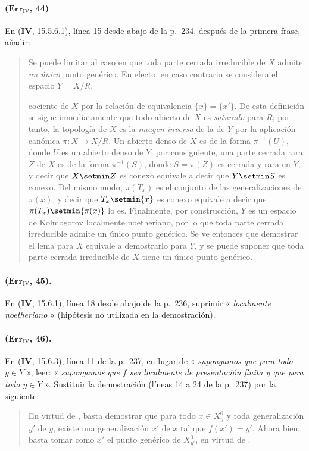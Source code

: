 \paragraph{($\mathbf{Err}_{\mathrm{IV}}$, 44)}
En (\textbf{IV}, 15.5.6.1), línea 15 desde abajo de la p.~234, después de la primera
frase, añadir:

\begin{quote}
Se puede limitar al caso en que toda parte cerrada irreducible de $X$
admite \emph{un único} punto genérico. En efecto, en caso contrario se considera
el espacio $Y=X/R$,

cociente de $X$ por la relación de equivalencia
$\overline{\{x\}}=\overline{\{x'\}}$. De esta definición se sigue
inmediatamente que todo abierto de $X$ es \emph{saturado} para $R$; por tanto, la
topología de $X$ es la \emph{imagen inversa} de la de $Y$ por la aplicación
canónica $\pi:X\to X/R$. Un abierto denso de $X$ es de la forma
$\pi^{-1}(U)$, donde $U$ es un abierto denso de $Y$; por consiguiente, una
parte cerrada rara $Z$ de $X$ es de la forma $\pi^{-1}(S)$, donde
$S=\pi(Z)$ es cerrada y rara en $Y$, y decir que $X\setmin Z$ es conexo equivale
a decir que $Y\setmin S$ es conexo. Del mismo modo, $\pi(T_x)$ es el conjunto de
las generalizaciones de $\pi(x)$, y decir que $T_x\setmin\{x\}$ es conexo
equivale a decir que $\pi(T_x)\setmin\{\pi(x)\}$ lo es. Finalmente, por
construcción, $Y$ es un espacio de Kolmogorov localmente noetheriano, por lo
que toda parte cerrada irreducible admite un único punto genérico.
Se ve entonces que demostrar el lema para $X$ equivale a demostrarlo para
$Y$, y se puede suponer que toda parte cerrada irreducible de $X$ tiene un
único punto genérico.
\end{quote}

\paragraph{($\mathbf{Err}_{\mathrm{IV}}$, 45).}
En (\textbf{IV}, 15.6.1), línea 18 desde abajo de la p.~236, suprimir « \emph{localmente noetheriano} » (hipótesis no utilizada en la demostración).

\paragraph{($\mathbf{Err}_{\mathrm{IV}}$, 46).}
En (\textbf{IV}, 15.6.3), línea 11 de la p.~237, en lugar de « \emph{supongamos que para todo $y\in Y$} », leer: « \emph{supongamos que $f$ sea localmente de presentación finita y que para todo $y\in Y$} ». Sustituir la
demostración (líneas 14 a 24 de la p.~237) por la siguiente:
\begin{quote}
En virtud de {}, basta demostrar
que para todo $x\in X_y^0$ y toda generalización $y'$ de $y$, existe una
generalización $x'$ de $x$ tal que $f(x')=y'$. Ahora bien, basta tomar
como $x'$ el punto genérico de $X_{y'}^0$, en virtud de
{}.
\end{quote}

